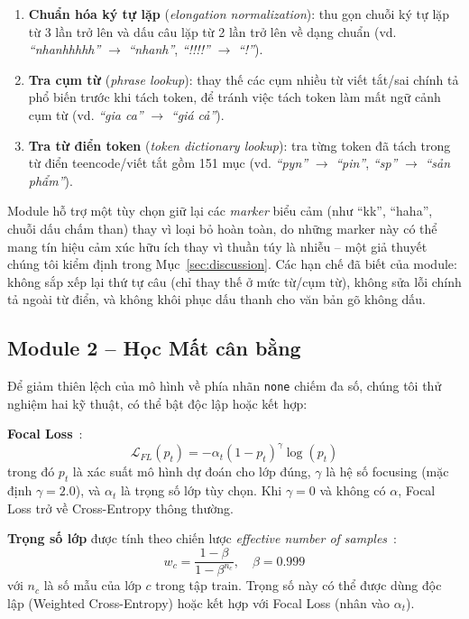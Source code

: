 \documentclass[11pt]{article}
\begin{document}
\begin{enumerate}
    \item \textbf{Chuẩn hóa ký tự lặp} (\textit{elongation normalization}): thu gọn chuỗi ký tự lặp từ 3 lần trở lên và dấu câu lặp từ 2 lần trở lên về dạng chuẩn (vd. \textit{``nhanhhhhh''} $\rightarrow$ \textit{``nhanh''}, \textit{``!!!!''} $\rightarrow$ \textit{``!''}).
    \item \textbf{Tra cụm từ} (\textit{phrase lookup}): thay thế các cụm nhiều từ viết tắt/sai chính tả phổ biến trước khi tách token, để tránh việc tách token làm mất ngữ cảnh cụm từ (vd. \textit{``gia ca''} $\rightarrow$ \textit{``giá cả''}).
    \item \textbf{Tra từ điển token} (\textit{token dictionary lookup}): tra từng token đã tách trong từ điển teencode/viết tắt gồm 151 mục (vd. \textit{``pyn''} $\rightarrow$ \textit{``pin''}, \textit{``sp''} $\rightarrow$ \textit{``sản phẩm''}).
\end{enumerate}

Module hỗ trợ một tùy chọn giữ lại các \textit{marker} biểu cảm (như ``kk'', ``haha'', chuỗi dấu chấm than) thay vì loại bỏ hoàn toàn, do những marker này có thể mang tín hiệu cảm xúc hữu ích thay vì thuần túy là nhiễu -- một giả thuyết chúng tôi kiểm định trong Mục~\ref{sec:discussion}. Các hạn chế đã biết của module: không sắp xếp lại thứ tự câu (chỉ thay thế ở mức từ/cụm từ), không sửa lỗi chính tả ngoài từ điển, và không khôi phục dấu thanh cho văn bản gõ không dấu.

\subsection{Module 2 -- Học Mất cân bằng}
\label{sec:module2}
Để giảm thiên lệch của mô hình về phía nhãn \texttt{none} chiếm đa số, chúng tôi thử nghiệm hai kỹ thuật, có thể bật độc lập hoặc kết hợp:

\textbf{Focal Loss}~\citep{lin2017focal}:
\begin{equation}
    \mathcal{L}_{FL}(p_t) = -\alpha_t (1-p_t)^\gamma \log(p_t)
\end{equation}
trong đó $p_t$ là xác suất mô hình dự đoán cho lớp đúng, $\gamma$ là hệ số focusing (mặc định $\gamma=2.0$), và $\alpha_t$ là trọng số lớp tùy chọn. Khi $\gamma=0$ và không có $\alpha$, Focal Loss trở về Cross-Entropy thông thường.

\textbf{Trọng số lớp} được tính theo chiến lược \textit{effective number of samples}~\citep{cui2019classbalanced}:
\begin{equation}
    w_c = \frac{1-\beta}{1-\beta^{n_c}}, \quad \beta = 0.999
\end{equation}
với $n_c$ là số mẫu của lớp $c$ trong tập train. Trọng số này có thể được dùng độc lập (Weighted Cross-Entropy) hoặc kết hợp với Focal Loss (nhân vào $\alpha_t$).
\end{document}

